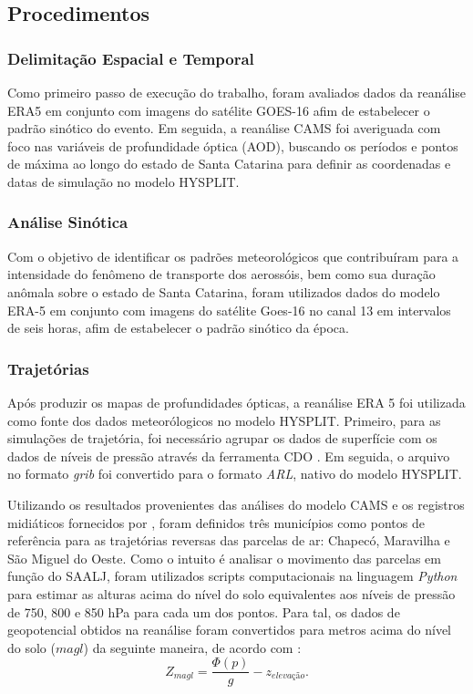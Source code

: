 \subsection{Procedimentos}
	\subsubsection{Delimitação Espacial e Temporal}
	Como primeiro passo de execução do trabalho, foram avaliados dados da reanálise ERA5 em conjunto com imagens do satélite GOES-16 afim de estabelecer o padrão sinótico do evento. Em seguida, a reanálise CAMS foi averiguada com foco nas variáveis de profundidade óptica (AOD), buscando os períodos e pontos de máxima ao longo do estado de Santa Catarina para definir as coordenadas e datas de simulação no modelo HYSPLIT.
	
	\subsubsection{Análise Sinótica}
	Com o objetivo de identificar os padrões meteorológicos que contribuíram para a intensidade do fenômeno de transporte dos aerossóis, bem como sua duração anômala sobre o estado de Santa Catarina, foram utilizados dados do modelo ERA-5 em conjunto com imagens do satélite Goes-16 no canal 13 em intervalos de seis horas, afim de estabelecer o padrão sinótico da época. 

	\subsubsection{Trajetórias}
	
	Após produzir os mapas de profundidades ópticas, a reanálise ERA 5 foi utilizada como fonte dos dados meteorólogicos no modelo HYSPLIT. Primeiro, para as simulações de trajetória, foi necessário agrupar os dados de superfície com os dados de níveis de pressão através da ferramenta CDO \autocite{INPE2016mtc}. Em seguida, o arquivo no formato \textit{grib} foi convertido para o formato \textit{ARL}, nativo do modelo HYSPLIT.
	
	Utilizando os resultados provenientes das análises do modelo CAMS e os registros midiáticos fornecidos por \textcite{epagri2024chuvapreta}, foram definidos três municípios como pontos de referência para as trajetórias reversas das parcelas de ar: Chapecó, Maravilha e São Miguel do Oeste. Como o intuito é analisar o movimento das parcelas em função do SAALJ, foram utilizados scripts computacionais na linguagem \textit{Python} para estimar as alturas acima do nível do solo equivalentes aos níveis de pressão de 750, 800 e 850 hPa para cada um dos pontos. Para tal, os dados de geopotencial obtidos na reanálise foram convertidos para metros acima do nível do solo ($m agl$) da seguinte maneira, de acordo com \textcite{holton2012introduction}:
	\begin{equation}
		Z_{m agl} = \frac{\Phi(p)}{g} - z_{elevação}.
	\end{equation}
	
